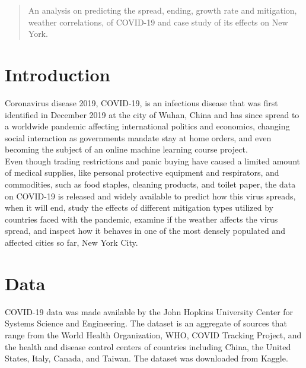 \documentclass{homework}
\begin{document}
\maketitle

\begin{abstract}
  \noindent An analysis on predicting the spread, ending, growth rate and mitigation, weather correlations, of COVID-19 and case study of its effects on New York.
\end{abstract}

\newpage
\thispagestyle{empty}
\tableofcontents

\newpage
\setcounter{page}{1}
\section{Introduction}

Coronavirus disease 2019, COVID-19, is an infectious disease that was first identified in December 2019 at the city of Wuhan, China and has since spread to a worldwide pandemic affecting international politics and economics, changing social interaction as governments mandate stay at home orders, and even becoming the subject of an online machine learning course project.\\

Even though trading restrictions and panic buying have caused a limited amount of medical supplies, like personal protective equipment and respirators, and commodities, such as food staples, cleaning products, and toilet paper, the data on COVID-19 is released and widely available to predict how this virus spreads, when it will end, study the effects of different mitigation types utilized by countries faced with the pandemic, examine if the weather affects the virus spread, and inspect how it behaves in one of the most densely populated and affected cities so far, New York City.

\section{Data}

COVID-19 data was made available by the John Hopkins University Center for Systems Science and Engineering. The dataset is an aggregate of sources that range from the World Health Organization, WHO, COVID Tracking Project, and the health and disease control centers of countries including China, the United States, Italy, Canada, and Taiwan. The dataset was downloaded from Kaggle. \\
\end{document}
